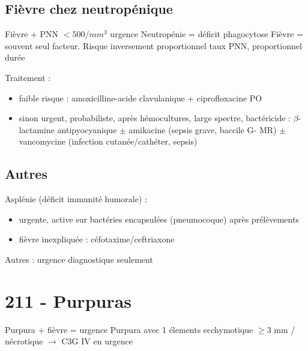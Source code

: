 \subsection{Fièvre chez neutropénique}
\label{sec:org077134a}
Fièvre + PNN \(< 500/mm^3\) urgence 
Neutropénie = déficit phagocytose
Fièvre = souvent seul facteur.
Risque inversement proportionnel taux PNN, proportionnel durée

Traitement :
\begin{itemize}
\item faible risque : amoxicilline-acide clavulanique + ciprofloxacine PO
\item sinon urgent, probabiliste, après hémocultures, large spectre, bactéricide : \(\beta\)-lactamine antipyocyanique \(\pm\) amikacine (sepsis grave, baccile G- MR) \(\pm\) vancomycine (infection cutanée/cathéter, sepsis)
\end{itemize}


\subsection{Autres}
\label{sec:org8c06c0e}
Asplénie (déficit immunité humorale) : 
\begin{itemize}
\item urgente, active sur bactéries encapsulées (pneumocoque) après prélèvements
\item fièvre inexpliquée : céfotaxime/ceftriaxone
\end{itemize}
Autres : urgence diagnostique seulement

\section{211 - Purpuras}
\label{sec:orga164eae}
\danger Purpura + fièvre = urgence 
\danger Purpura avec 1 élements ecchymotique $\ge 3$ mm / nécrotique $\to$ C3G
IV en urgence 


